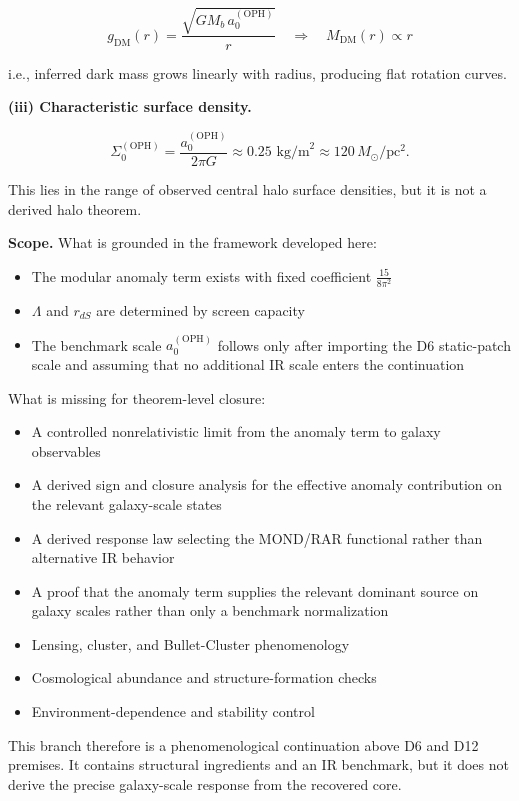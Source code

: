 \[
g_{\mathrm{DM}}(r) = \frac{\sqrt{G M_b \, a_0^{\mathrm{(OPH)}}}}{r}
\quad \Rightarrow \quad
M_{\mathrm{DM}}(r) \propto r
\]

i.e., inferred dark mass grows linearly with radius, producing flat rotation curves.

\textbf{(iii) Characteristic surface density.}

\[
\Sigma_0^{\mathrm{(OPH)}} = \frac{a_0^{\mathrm{(OPH)}}}{2\pi G}
\approx 0.25 \text{ kg/m}^2 \approx 120 \, M_\odot/\text{pc}^2.
\]

This lies in the range of observed central halo surface densities, but it is not a derived halo theorem.

\textbf{Scope.} What is grounded in the framework developed here:

\begin{itemize}
\tightlist
\item
  The modular anomaly term exists with fixed coefficient \(\frac{15}{8\pi^2}\)
\item
  \(\Lambda\) and \(r_{dS}\) are determined by screen capacity
\item
  The benchmark scale \(a_0^{\mathrm{(OPH)}}\) follows only after importing the D6 static-patch scale and assuming that no additional IR scale enters the continuation
\end{itemize}

What is missing for theorem-level closure:

\begin{itemize}
\tightlist
\item
  A controlled nonrelativistic limit from the anomaly term to galaxy observables
\item
  A derived sign and closure analysis for the effective anomaly contribution on the relevant galaxy-scale states
\item
  A derived response law selecting the MOND/RAR functional rather than alternative IR behavior
\item
  A proof that the anomaly term supplies the relevant dominant source on galaxy scales rather than only a benchmark normalization
\item
  Lensing, cluster, and Bullet-Cluster phenomenology
\item
  Cosmological abundance and structure-formation checks
\item
  Environment-dependence and stability control
\end{itemize}

This branch therefore is a phenomenological continuation above D6 and D12 premises. It contains structural ingredients and an IR benchmark, but it does not derive the precise galaxy-scale response from the recovered core.


